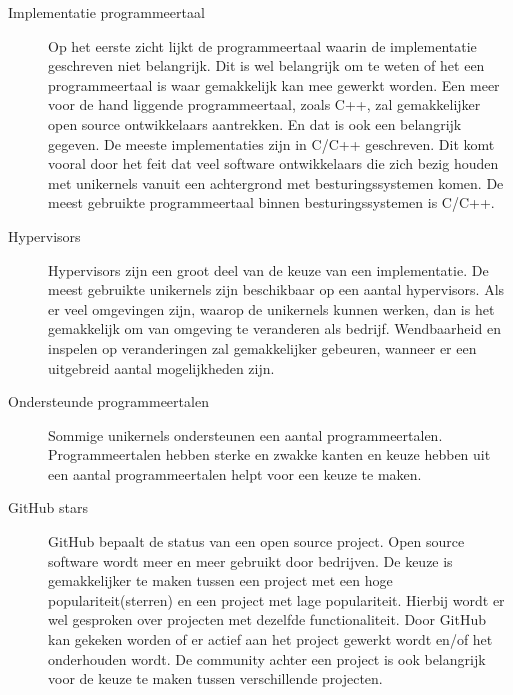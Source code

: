 \begin{description}
\item [Implementatie programmeertaal]
Op het eerste zicht lijkt de programmeertaal waarin de implementatie geschreven niet belangrijk. Dit is wel belangrijk om te weten of het een programmeertaal is waar gemakkelijk kan mee gewerkt worden.
Een meer voor de hand liggende programmeertaal, zoals C++, zal gemakkelijker open source ontwikkelaars aantrekken. En dat is ook een belangrijk gegeven.
De meeste implementaties zijn in C/C++ geschreven. Dit komt vooral door het feit dat veel software ontwikkelaars die zich bezig houden met unikernels vanuit een achtergrond met besturingssystemen komen.
De meest gebruikte programmeertaal binnen besturingssystemen is C/C++.

\item [Hypervisors] 
Hypervisors zijn een groot deel van de keuze van een implementatie. De meest gebruikte unikernels zijn beschikbaar op een aantal hypervisors. Als er veel omgevingen zijn, waarop de unikernels kunnen werken, dan is het gemakkelijk om van omgeving te veranderen als bedrijf. Wendbaarheid en inspelen op veranderingen zal gemakkelijker gebeuren, wanneer er een uitgebreid aantal mogelijkheden zijn.

\item [Ondersteunde programmeertalen]
Sommige unikernels ondersteunen een aantal programmeertalen. Programmeertalen hebben sterke en zwakke kanten en keuze hebben uit een aantal programmeertalen helpt voor een keuze te maken.

\item [GitHub stars] 
GitHub bepaalt de status van een open source project. Open source software wordt meer en meer gebruikt door bedrijven. De keuze is gemakkelijker te maken tussen een project met een hoge populariteit(sterren) en een project met lage populariteit. Hierbij wordt er wel gesproken over projecten met dezelfde functionaliteit. Door GitHub kan gekeken worden of er actief aan het project gewerkt wordt en/of het onderhouden wordt. De community achter een project is ook belangrijk voor de keuze te maken tussen verschillende projecten.

\end{description}

